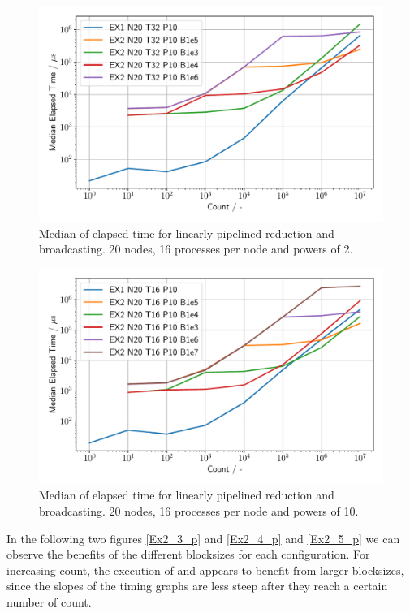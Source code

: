 \begin{figure}[h]
    \begin{center}
        \includegraphics[width=0.7\linewidth]{figures/Ex2_1.pdf}
        \caption{Median of elapsed time for linearly pipelined reduction and broadcasting. 
        20 nodes, 16 processes per node and powers of 2.}
        \label{Ex2_1_p}
    \end{center}
\end{figure}
 
\null

\begin{figure}[h]
    \begin{center}
        \includegraphics[width=0.7\linewidth]{figures/Ex2_2.pdf}
        \caption{Median of elapsed time for linearly pipelined reduction and broadcasting. 
        20 nodes, 16 processes per node and powers of 10.}
        \label{Ex2_2_p}
    \end{center}
\end{figure}



\pagebreak

In the following two figures \ref{Ex2_3_p} and \ref{Ex2_4_p} and \ref{Ex2_5_p} we can observe
the benefits of the different blocksizes for each configuration. For increasing
count, the execution of  and   appears to benefit from larger
blocksizes, since the slopes of the timing graphs are less steep after they reach a certain number of count.


